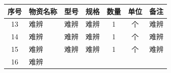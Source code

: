 \documentclass[UTF8,10pt,a4paper,fontset=fandol]{ctexart}
\newcommand{\fieldvalue}[1]{#1}
\newcommand{\handwritten}[1]{#1}
\begin{document}
\begin{tabularx}{\textwidth}{c|X|X|X|c|c|X}
\hline
序号 & 物资名称 & 型号 & 规格 & 数量 & 单位 & 备注\\
\hline
13 &
\fieldvalue{\handwritten{难辨}} &
\fieldvalue{\handwritten{难辨}} &
\fieldvalue{\handwritten{难辨}} &
\fieldvalue{\handwritten{1}} &
个 &
\fieldvalue{\handwritten{难辨}}\\
\hline
14 &
\fieldvalue{\handwritten{难辨}} &
\fieldvalue{\handwritten{难辨}} &
\fieldvalue{\handwritten{难辨}} &
\fieldvalue{\handwritten{1}} &
个 &
\fieldvalue{\handwritten{难辨}}\\
\hline
15 &
\fieldvalue{\handwritten{难辨}} &
\fieldvalue{\handwritten{难辨}} &
\fieldvalue{\handwritten{难辨}} &
\fieldvalue{\handwritten{1}} &
个 &
\fieldvalue{\handwritten{难辨}}\\
\hline
16 &
\fieldvalue{\handwritten{难辨}} &

\end{tabularx}
\end{document}
